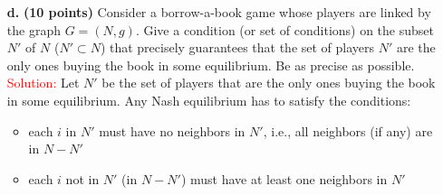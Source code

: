 \documentclass[11pt]{article} %
\begin{document}
\begin{itemize}
 

\item[\textbf{d.}]  \textbf{(10 points)} Consider a borrow-a-book game whose players are linked by the graph $G=(N,g)$. Give a condition (or set of conditions) on the subset $N'$ of $N$ ($N'\subset N$) that precisely guarantees that the set of players $N'$ are the only ones buying the book in some equilibrium. Be as precise as possible.\\

\textcolor{red}{Solution:}
Let $N'$ be the set of players that are the only ones buying the book in some equilibrium. Any Nash equilibrium has to satisfy the conditions:
\begin{itemize}
\item each $i$ in $N'$ must have no neighbors in $N'$, i.e., all neighbors (if any) are in $N-N'$
\item each $i$ not in $N'$ (in $N-N'$) must have at least one neighbors in $N'$  
\end{itemize}




\end{itemize}
\end{document}

